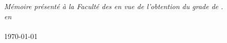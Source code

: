 \begin{titlepage}
\begin{center}

\vfill



\textit{Mémoire présenté à la Faculté des \myFaculty en vue de l'obtention du grade de \myDegree.}\\[0.2cm] %
\textit{en}\\[0.2cm]
\myDepartment \\[2cm]

{\large \today}\\




\end{center}

\end{titlepage}